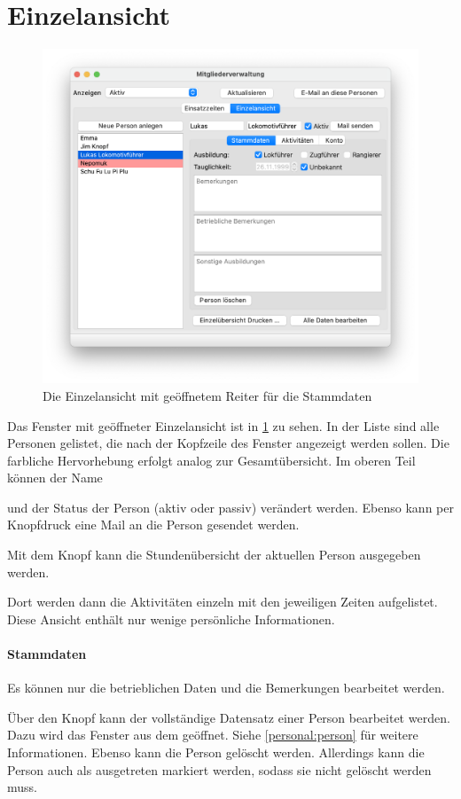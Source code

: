 \section{Einzelansicht}\label{einsatz:personal:einzelansicht}
\begin{figure}[!h]
	\includegraphics[width=\textwidth]{img/einzelansicht_stammdaten}
	\caption{Die Einzelansicht mit geöffnetem Reiter für die Stammdaten}
	\label{fig:einsatz:personal:einzel:stammdaten}
\end{figure}
Das Fenster mit geöffneter Einzelansicht ist in \cref{fig:einsatz:personal:einzel:stammdaten} zu sehen.
In der Liste sind alle Personen gelistet, die nach der Kopfzeile des Fenster angezeigt werden sollen.
Die farbliche Hervorhebung erfolgt analog zur Gesamtübersicht.
Im oberen Teil können der Name
\begin{neu}
und der Status der Person (aktiv oder passiv) verändert werden.
Ebenso kann per Knopfdruck eine Mail an die Person gesendet werden.
\end{neu}

\begin{neu}
Mit dem Knopf  kann die Stundenübersicht der aktuellen Person ausgegeben werden.
\end{neu}
Dort werden dann die Aktivitäten einzeln mit den jeweiligen Zeiten aufgelistet.
Diese Ansicht enthält nur wenige persönliche Informationen.


\paragraph{Stammdaten}
\begin{neu}
Es können nur die betrieblichen Daten und die Bemerkungen bearbeitet werden.
\end{neu}
Über den Knopf  kann der vollständige Datensatz einer Person bearbeitet werden.
Dazu wird das Fenster aus dem \Personal geöffnet.
Siehe \cref{personal:person} für weitere Informationen.
Ebenso kann die Person gelöscht werden.
Allerdings kann die Person auch als ausgetreten markiert werden,
sodass sie nicht gelöscht werden muss.

